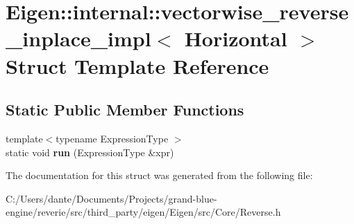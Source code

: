 \hypertarget{struct_eigen_1_1internal_1_1vectorwise__reverse__inplace__impl_3_01_horizontal_01_4}{}\section{Eigen\+::internal\+::vectorwise\+\_\+reverse\+\_\+inplace\+\_\+impl$<$ Horizontal $>$ Struct Template Reference}
\label{struct_eigen_1_1internal_1_1vectorwise__reverse__inplace__impl_3_01_horizontal_01_4}
\subsection*{Static Public Member Functions}
\begin{DoxyCompactItemize}
\item 
\mbox{\label{struct_eigen_1_1internal_1_1vectorwise__reverse__inplace__impl_3_01_horizontal_01_4_af29b95ed902a8adad594cd29f7dde0f9}} 
{\footnotesize template$<$typename Expression\+Type $>$ }\\static void {\bfseries run} (Expression\+Type \&xpr)
\end{DoxyCompactItemize}


The documentation for this struct was generated from the following file\+:\begin{DoxyCompactItemize}
\item 
C\+:/\+Users/dante/\+Documents/\+Projects/grand-\/blue-\/engine/reverie/src/third\+\_\+party/eigen/\+Eigen/src/\+Core/Reverse.\+h\end{DoxyCompactItemize}
